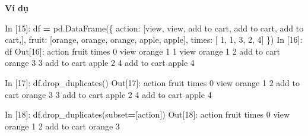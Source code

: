 \documentclass[
]{book}
\newenvironment{Shaded}{\begin{snugshade}}{\end{snugshade}}
\newcommand{\DecValTok}[1]{\textcolor[rgb]{0.00,0.00,0.81}{#1}}
\newcommand{\NormalTok}[1]{#1}
\newcommand{\OperatorTok}[1]{\textcolor[rgb]{0.81,0.36,0.00}{\textbf{#1}}}
\newcommand{\StringTok}[1]{\textcolor[rgb]{0.31,0.60,0.02}{#1}}
\begin{document}
\textbf{Ví dụ}

\begin{Shaded}
\begin{Highlighting}[]
\NormalTok{In [}\DecValTok{15}\NormalTok{]: df }\OperatorTok{=}\NormalTok{ pd.DataFrame(\{}
    \StringTok{\textquotesingle{}action\textquotesingle{}}\NormalTok{: [}\StringTok{\textquotesingle{}view\textquotesingle{}}\NormalTok{, }\StringTok{\textquotesingle{}view\textquotesingle{}}\NormalTok{, }\StringTok{\textquotesingle{}add to cart\textquotesingle{}}\NormalTok{, }\StringTok{\textquotesingle{}add to cart\textquotesingle{}}\NormalTok{, }\StringTok{\textquotesingle{}add to cart\textquotesingle{}}\NormalTok{,],}
    \StringTok{\textquotesingle{}fruit\textquotesingle{}}\NormalTok{: [}\StringTok{\textquotesingle{}orange\textquotesingle{}}\NormalTok{, }\StringTok{\textquotesingle{}orange\textquotesingle{}}\NormalTok{, }\StringTok{\textquotesingle{}orange\textquotesingle{}}\NormalTok{, }\StringTok{\textquotesingle{}apple\textquotesingle{}}\NormalTok{, }\StringTok{\textquotesingle{}apple\textquotesingle{}}\NormalTok{],}
    \StringTok{\textquotesingle{}times\textquotesingle{}}\NormalTok{:   [ }\DecValTok{1}\NormalTok{, }\DecValTok{1}\NormalTok{, }\DecValTok{3}\NormalTok{, }\DecValTok{2}\NormalTok{, }\DecValTok{4}\NormalTok{]}
\NormalTok{\})}
\NormalTok{In [}\DecValTok{16}\NormalTok{]: df}
\NormalTok{Out[}\DecValTok{16}\NormalTok{]:}
\NormalTok{        action  fruit   times}
\DecValTok{0}\NormalTok{         view  orange      }\DecValTok{1}
\DecValTok{1}\NormalTok{         view  orange      }\DecValTok{1}
\DecValTok{2}\NormalTok{  add to cart  orange      }\DecValTok{3}
\DecValTok{3}\NormalTok{  add to cart   apple      }\DecValTok{2}
\DecValTok{4}\NormalTok{  add to cart   apple      }\DecValTok{4}

\NormalTok{In [}\DecValTok{17}\NormalTok{]: df.drop\_duplicates()}
\NormalTok{Out[}\DecValTok{17}\NormalTok{]:}
\NormalTok{        action  fruit   times}
\DecValTok{0}\NormalTok{         view  orange      }\DecValTok{1}
\DecValTok{2}\NormalTok{  add to cart  orange      }\DecValTok{3}
\DecValTok{3}\NormalTok{  add to cart   apple      }\DecValTok{2}
\DecValTok{4}\NormalTok{  add to cart   apple      }\DecValTok{4}

\NormalTok{In [}\DecValTok{18}\NormalTok{]: df.drop\_duplicates(subset}\OperatorTok{=}\NormalTok{[}\StringTok{\textquotesingle{}action\textquotesingle{}}\NormalTok{])}
\NormalTok{Out[}\DecValTok{18}\NormalTok{]:}
\NormalTok{        action  fruit   times}
\DecValTok{0}\NormalTok{         view  orange      }\DecValTok{1}
\DecValTok{2}\NormalTok{  add to cart  orange      }\DecValTok{3}


\end{Highlighting}
\end{Shaded}
\end{document}
